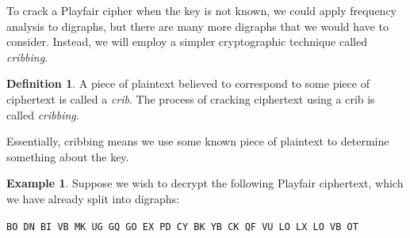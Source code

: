 \documentclass{book}
\theoremstyle{plain}
\theoremstyle{definition}
\newtheorem{definition}[theorem]{Definition}
\newtheorem{example}[theorem]{Example}
\newcommand{\ciphertext}[1]{\texttt{#1}} %
\begin{document}
To crack a Playfair cipher when the key is not known, we could apply frequency analysis to digraphs, but there are many more digraphs that we would have to consider. Instead, we will employ a simpler cryptographic technique called {\it cribbing}.

\begin{definition}
A piece of plaintext believed to correspond to some piece of ciphertext is called a {\it crib}. The process of cracking ciphertext using a crib is called {\it cribbing}.
\end{definition}

Essentially, cribbing means we use some known piece of plaintext to determine something about the key.

\begin{example}
Suppose we wish to decrypt the following Playfair ciphertext, which we have already split into digraphs:
\begin{center}
\ciphertext{BO DN BI VB MK UG GQ GO EX PD CY BK YB CK QF VU LO LX LO VB OT}
\end{center}


\end{example}
\end{document}
